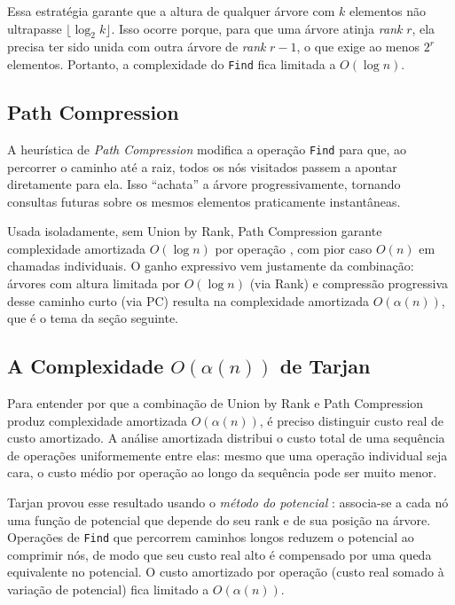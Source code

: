 \documentclass[12pt]{article}
\begin{document}
Essa estratégia garante que a altura de qualquer árvore com $k$ elementos não ultrapasse $\lfloor \log_2 k \rfloor$. Isso ocorre porque, para que uma árvore atinja \textit{rank} $r$, ela precisa ter sido unida com outra árvore de \textit{rank} $r-1$, o que exige ao menos $2^r$ elementos. Portanto, a complexidade do \texttt{Find} fica limitada a $O(\log n)$.

\subsection{Path Compression}

A heurística de \textit{Path Compression} modifica a operação \texttt{Find} para que, ao percorrer o caminho até a raiz, todos os nós visitados passem a apontar diretamente para ela. Isso ``achata'' a árvore progressivamente, tornando consultas futuras sobre os mesmos elementos praticamente instantâneas.

Usada isoladamente, sem Union by Rank, Path Compression garante complexidade amortizada $O(\log n)$ por operação \cite{tarjan1975}, com pior caso $O(n)$ em chamadas individuais. O ganho expressivo vem justamente da combinação: árvores com altura limitada por $O(\log n)$ (via Rank) e compressão progressiva desse caminho curto (via PC) resulta na complexidade amortizada $O(\alpha(n))$, que é o tema da seção seguinte.

\subsection{A Complexidade $O(\alpha(n))$ de Tarjan}

Para entender por que a combinação de Union by Rank e Path Compression produz complexidade amortizada $O(\alpha(n))$, é preciso distinguir custo real de custo amortizado. A análise amortizada distribui o custo total de uma sequência de operações uniformemente entre elas: mesmo que uma operação individual seja cara, o custo médio por operação ao longo da sequência pode ser muito menor.

Tarjan provou esse resultado usando o \textit{método do potencial} \cite{tarjan1985}: associa-se a cada nó uma função de potencial que depende do seu rank e de sua posição na árvore. Operações de \texttt{Find} que percorrem caminhos longos reduzem o potencial ao comprimir nós, de modo que seu custo real alto é compensado por uma queda equivalente no potencial. O custo amortizado por operação (custo real somado à variação de potencial) fica limitado a $O(\alpha(n))$.
\end{document}
